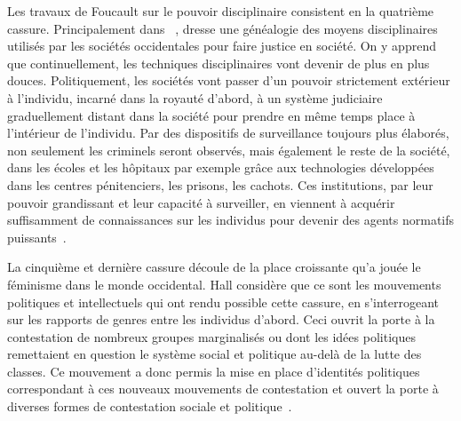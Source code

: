 Les travaux de Foucault sur le pouvoir disciplinaire consistent en la quatrième cassure.
Principalement dans ~\citeyearpar{Foucault2004a}, \citeauthor{Foucault2004a} dresse une généalogie des moyens disciplinaires utilisés par les sociétés occidentales pour faire justice en société.
On y apprend que continuellement, les techniques disciplinaires vont devenir de plus en plus douces.
Politiquement, les sociétés vont passer d'un pouvoir strictement extérieur à l'individu, incarné dans la royauté d'abord, à un système judiciaire graduellement distant dans la société pour prendre en même temps place à l'intérieur de l'individu.
Par des dispositifs de surveillance toujours plus élaborés, non seulement les criminels seront observés, mais également le reste de la société, dans les écoles et les hôpitaux par exemple grâce aux technologies développées dans les centres pénitenciers, les prisons, les cachots.
Ces institutions, par leur pouvoir grandissant et leur capacité à surveiller, en viennent à acquérir suffisamment de connaissances sur les individus pour devenir des agents normatifs puissants~\citep[608--609]{Hall1996a}.

La cinquième et dernière cassure découle de la place croissante qu'a jouée le féminisme dans le monde occidental.
Hall considère que ce sont les mouvements politiques et intellectuels qui ont rendu possible cette cassure, en s'interrogeant sur les rapports de genres entre les individus d'abord.
Ceci ouvrit la porte à la contestation de nombreux groupes marginalisés ou dont les idées politiques remettaient en question le système social et politique au-delà de la lutte des classes.
Ce mouvement a donc permis la mise en place d'identités politiques correspondant à ces nouveaux mouvements de contestation et ouvert la porte à diverses formes de contestation sociale et politique~\citeyearpar[610]{Hall1996a}.

